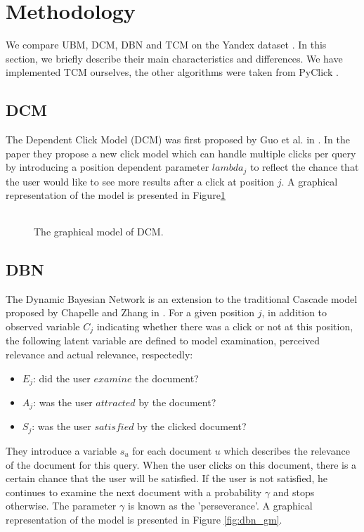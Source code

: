 \section{Methodology}
\label{sec:methodology}
We compare UBM, DCM, DBN and TCM on the Yandex dataset \cite{yandex}. In this section, we briefly describe their main characteristics and differences. We have implemented TCM ourselves, the other algorithms were taken from PyClick \cite{PyClick}.

\subsection{DCM}
The Dependent Click Model (DCM) was first proposed by Guo et al. in \cite{Guo2009}. In the paper they propose a new click model which can handle multiple clicks per query by introducing a position dependent parameter $lambda_j$ to reflect the chance that the user would like to see more results after a click at position $j$. A graphical representation of the model is presented in Figure\ref{fig:dcm_gm} 

\begin{figure}[ht!]
  \begin{center}
  	\begin{tabular}{c}
  		
  	\end{tabular}
  \end{center}
  \caption{The graphical model of DCM.}	
  \label{fig:dcm_gm}
\end{figure}

\subsection{DBN}
The Dynamic Bayesian Network is an extension to the traditional Cascade model proposed by Chapelle and Zhang in \cite{Zhang2011}. For a given position $j$, in addition to observed variable $C_j$ indicating whether there was a click or not at this position, the following latent variable are defined to model examination, perceived relevance and actual relevance, respectedly:
\begin{itemize}
	\item $E_j$: did the user $examine$ the document?
	\item $A_j$: was the user $attracted$ by the document?
	\item $S_j$: was the user $satisfied$ by the clicked document?
\end{itemize}
They introduce a variable $s_u$ for each document $u$ which describes the relevance of the document for this query. When the user clicks on this document, there is a certain chance that the user will be satisfied. If the user is not satisfied, he continues to examine the next document with a probability $\gamma$ and stops otherwise. The parameter $\gamma$ is known as the 'perseverance'. A graphical representation of the model is presented in Figure \ref{fig:dbn_gm}. 

